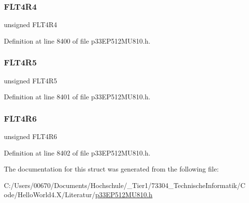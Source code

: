 \subsubsection{\texorpdfstring{F\+L\+T4\+R4}{FLT4R4}}
{\footnotesize\ttfamily unsigned F\+L\+T4\+R4}



Definition at line 8400 of file p33\+E\+P512\+M\+U810.\+h.

\mbox{\label{structtag_r_p_i_n_r13_b_i_t_s_a80a46acfe2b4fdf5a7dae59c09cbffde}} 
\subsubsection{\texorpdfstring{F\+L\+T4\+R5}{FLT4R5}}
{\footnotesize\ttfamily unsigned F\+L\+T4\+R5}



Definition at line 8401 of file p33\+E\+P512\+M\+U810.\+h.

\mbox{\label{structtag_r_p_i_n_r13_b_i_t_s_a3064b9ed910683ec4d1c23f24f47777d}} 
\subsubsection{\texorpdfstring{F\+L\+T4\+R6}{FLT4R6}}
{\footnotesize\ttfamily unsigned F\+L\+T4\+R6}



Definition at line 8402 of file p33\+E\+P512\+M\+U810.\+h.



The documentation for this struct was generated from the following file\+:\begin{DoxyCompactItemize}
\item 
C\+:/\+Users/00670/\+Documents/\+Hochschule/\+\_\+\+Tier1/73304\+\_\+\+Technische\+Informatik/\+Code/\+Hello\+World4.\+X/\+Literatur/\hyperlink{p33_e_p512_m_u810_8h}{p33\+E\+P512\+M\+U810.\+h}\end{DoxyCompactItemize}
